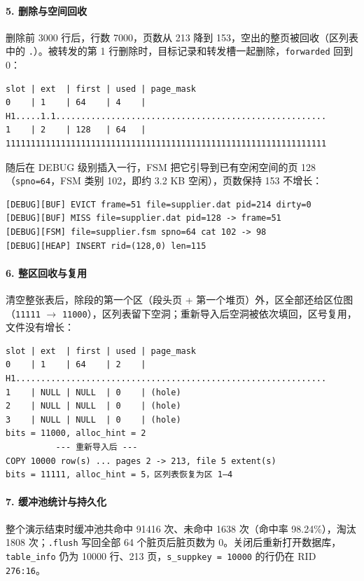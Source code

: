 \documentclass[11pt,a4paper]{ctexart}
\newcommand{\code}[1]{\texttt{#1}}
\begin{document}
\paragraph{5. 删除与空间回收} 删除前 3000 行后，行数 7000，页数从 213 降到 153，空出的整页被回收（区列表中的 \code{.}）。被转发的第 1 行删除时，目标记录和转发槽一起删除，\code{forwarded} 回到 0：

\begin{lstlisting}[style=wide]
slot | ext  | first | used | page_mask
0    | 1    | 64    | 4    | H1.....1.1......................................................
1    | 2    | 128   | 64   | 1111111111111111111111111111111111111111111111111111111111111111
\end{lstlisting}

随后在 DEBUG 级别插入一行，FSM 把它引导到已有空闲空间的页 128（\code{spno=64}，FSM 类别 102，即约 3.2 KB 空闲），页数保持 153 不增长：

\begin{lstlisting}[style=plain]
[DEBUG][BUF] EVICT frame=51 file=supplier.dat pid=214 dirty=0
[DEBUG][BUF] MISS file=supplier.dat pid=128 -> frame=51
[DEBUG][FSM] file=supplier.fsm spno=64 cat 102 -> 98
[DEBUG][HEAP] INSERT rid=(128,0) len=115
\end{lstlisting}

\paragraph{6. 整区回收与复用} 清空整张表后，除段的第一个区（段头页 + 第一个堆页）外，区全部还给区位图（\code{11111} $\rightarrow$ \code{11000}），区列表留下空洞；重新导入后空洞被依次填回，区号复用，文件没有增长：

\begin{lstlisting}[style=wide]
slot | ext  | first | used | page_mask
0    | 1    | 64    | 2    | H1..............................................................
1    | NULL | NULL  | 0    | (hole)
2    | NULL | NULL  | 0    | (hole)
3    | NULL | NULL  | 0    | (hole)
bits = 11000, alloc_hint = 2
          --- 重新导入后 ---
COPY 10000 row(s) ... pages 2 -> 213, file 5 extent(s)
bits = 11111, alloc_hint = 5，区列表恢复为区 1–4
\end{lstlisting}

\paragraph{7. 缓冲池统计与持久化} 整个演示结束时缓冲池共命中 91416 次、未命中 1638 次（命中率 98.24\%），淘汰 1808 次；\code{.flush} 写回全部 64 个脏页后脏页数为 0。关闭后重新打开数据库，\code{table\_info} 仍为 10000 行、213 页，\code{s\_suppkey = 10000} 的行仍在 RID \code{276:16}。
\end{document}
